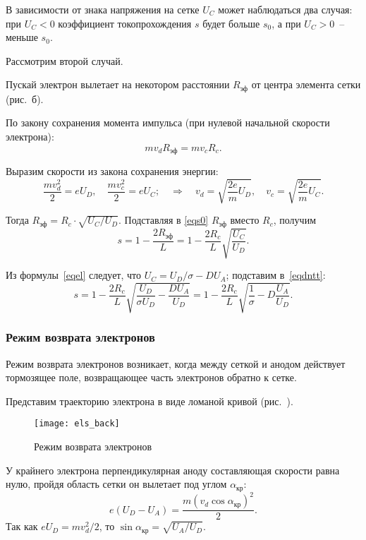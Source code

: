В зависимости от знака напряжения на сетке \( U_C \) может наблюдаться
два случая: при \( U_C < 0 \) коэффициент токопрохождения \( s \) будет больше
\( s_0 \), а при \( U_C > 0 \)~-- меньше \( s_0 \).

Рассмотрим второй случай.

Пускай электрон вылетает на некотором расстоянии \( R_\text{эф} \) от центра
элемента сетки (рис.~б).

По закону сохранения момента импульса (при нулевой начальной скорости
электрона):
\[
  m v_d R_\text{эф} = m v_c R_c.
\]

Выразим скорости из закона сохранения энергии:
\[
  \frac{m v_d^2}{2} = e U_D, \quad \frac{m v_c^2}{2} = e U_C; \quad \Rightarrow
    \quad v_d = \sqrt{\frac{2 e}{m} U_D}, \quad v_c = \sqrt{\frac{2 e}{m} U_C}.
\]

Тогда \( R_\text{эф} = R_c \cdot \sqrt{U_C / U_D} \). Подставляя в \eqref{eqs0}
\( R_\text{эф} \) вместо \( R_c \), получим
\begin{equation}
  s = 1 - \frac{2 R_\text{эф}}{L} = 1 - \frac{2 R_c}{L} \sqrt{\frac{U_C}{U_D}}.
  \label{eqdntt}
\end{equation}

Из формулы~\eqref{eqel} следует, что \( U_C = U_D / \sigma - D U_A \); подставим
в~\eqref{eqdntt}:
\[
  s = 1 - \frac{2 R_c}{L} \sqrt{\frac{U_D}{\sigma U_D} - \frac{D U_A}{U_D}} =
    1 - \frac{2 R_c}{L} \sqrt{\frac{1}{\sigma} - D \frac{U_A}{U_D}}.
\]

\subsubsection{Режим возврата электронов}

Режим возврата электронов возникает, когда между сеткой и анодом действует
тормозящее поле, возвращающее часть электронов обратно к сетке.

Представим траекторию электрона в виде ломаной кривой (рис.~).
\begin{figure}[h!]
  \center
  \texttt{[image: els\_back]}
  \caption{Режим возврата электронов}
  \label{picEB}  
\end{figure}

У крайнего электрона перпендикулярная аноду составляющая скорости равна нулю,
пройдя область сетки он вылетает под углом \( \alpha_\text{кр} \):
\[
  e (U_D - U_A) = \frac{m (v_d \cos\alpha_\text{кр})^2}{2}.
\]
Так как \( e U_D = m v_d^2 / 2 \), то
\( \sin\alpha_\text{кр} = \sqrt{U_A / U_D} \).

